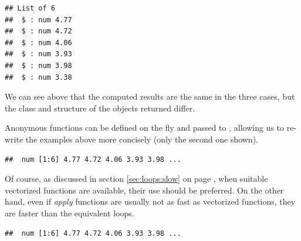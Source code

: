 \documentclass[krantz2]{krantz}\usepackage{knitr}
\begin{document}
\begin{knitrout}\footnotesize
{}\color{fgcolor}\begin{kframe}
\begin{alltt}
 \hlkwb{<-} \hlstd{(}     \hlstd{=} \hlstd{,}  \hlstd{=} \hlstd{)}
\end{alltt}
\begin{verbatim}
## List of 6
##  $ : num 4.77
##  $ : num 4.72
##  $ : num 4.06
##  $ : num 3.93
##  $ : num 3.98
##  $ : num 3.38
\end{verbatim}
\end{kframe}
\end{knitrout}

We can see above that the computed results are the same in the three cases, but the class and structure of the objects returned differ.

Anonymous functions can be defined on the fly and passed to , allowing us to re-write the examples above more concisely (only the second one shown).

\begin{knitrout}\footnotesize
{}\color{fgcolor}\begin{kframe}
\begin{alltt}
 \hlkwb{<-} \hlstd{(}   \hlstd{=} \hlstd{(}\hlstd{,} \hlstd{) \{} \hlopt{+}   \hlstd{=} \hlstd{)}
\end{alltt}
\begin{verbatim}
##  num [1:6] 4.77 4.72 4.06 3.93 3.98 ...
\end{verbatim}
\end{kframe}
\end{knitrout}

Of course, as discussed in section \ref{sec:loops:slow} on page \pageref{sec:loops:slow}, when suitable vectorized functions are available, their use should be preferred. On the other hand, even if \emph{apply} functions are usually not as fast as vectorized functions, they are faster than the equivalent  loops.

\begin{knitrout}\footnotesize
{}\color{fgcolor}\begin{kframe}
\begin{alltt}
 \hlkwb{<-}  \hlopt{+} 
\end{alltt}
\begin{verbatim}
##  num [1:6] 4.77 4.72 4.06 3.93 3.98 ...
\end{verbatim}
\end{kframe}
\end{knitrout}
\end{document}
